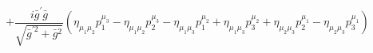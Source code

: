 %
\begin{dmath*}
%
  +  \frac{i {\bar g}^\prime {\bar g}{}}{\sqrt{{\bar g}^{\prime 2} + {\bar g}{}^2}} \left(\eta_{\mu_1 \mu_2} p_1^{\mu_3} - \eta_{\mu_1 \mu_2} p_2^{\mu_3} - \eta_{\mu_1 \mu_3} p_1^{\mu_2} + \eta_{\mu_1 \mu_3} p_3^{\mu_2} + \eta_{\mu_2 \mu_3} p_2^{\mu_1} - \eta_{\mu_2 \mu_3} p_3^{\mu_1}\right)
%
\end{dmath*}
%
